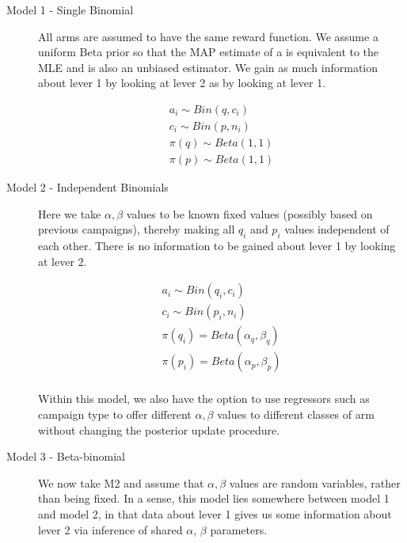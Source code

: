 \documentclass[11pt,a4,singlespacing,titlepagenumber=on]{scrreprt}
\numberwithin{equation}{chapter} %
\theoremstyle{remark}
\begin{document}
\begin{description}
	\item[Model 1 - Single Binomial]
All arms are assumed to have the same reward function. We assume a uniform Beta prior so that the MAP estimate of a is equivalent to the MLE and is also an unbiased estimator. We gain as much information about lever 1 by looking at lever 2 as by looking at lever 1.

  \begin{align}
	a_i \sim Bin(q,c_i) \\
	c_i \sim Bin(p,n_i) \\
	\pi(q) \sim Beta(1,1) \\
	\pi(p) \sim Beta(1,1) 
  \end{align}

	\item[Model 2 - Independent Binomials]
Here we take $\alpha, \beta$ values to be known fixed values (possibly based on previous campaigns), thereby making all $q_i$ and $p_i$ values independent of each other. There is no information to be gained about lever 1 by looking at lever 2.

  \begin{align}
	a_i \sim Bin(q_i,c_i) \\
	c_i \sim Bin(p_i,n_i) \\
	\pi(q_i) = Beta(\alpha_q,\beta_q) \\
	\pi(p_i) = Beta(\alpha_p,\beta_p) \\
  \end{align}

Within this model, we also have the option to use regressors such as campaign type to offer different $\alpha, \beta$ values to different classes of arm without changing the posterior update procedure.

	\item[Model 3 - Beta-binomial]



We now take M2 and assume that $\alpha, \beta$ values are random variables, rather than being fixed. In a sense, this model lies somewhere between model 1 and model 2, in that data about lever 1 gives us some information about lever 2 via inference of shared $\alpha$, $\beta$ parameters. 


\end{description}
\end{document}
